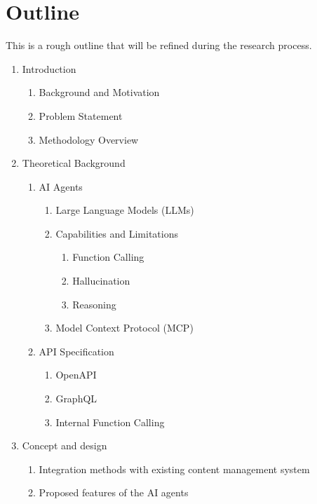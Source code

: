 \documentclass[12pt,a4paper]{article}
\begin{document}
\section*{Outline}
This is a rough outline that will be refined during the research process.
\begin{enumerate}
	\item Introduction
	      \begin{enumerate}
		      \item Background and Motivation
		      \item Problem Statement
		      \item Methodology Overview
	      \end{enumerate}
	\item Theoretical Background
	      \begin{enumerate}
		      \item AI Agents
		            \begin{enumerate}
			            \item Large Language Models (LLMs)
			            \item Capabilities and Limitations
			                  \begin{enumerate}
				                  \item Function Calling
				                  \item Hallucination
				                  \item Reasoning
			                  \end{enumerate}
			            \item Model Context Protocol (MCP)
		            \end{enumerate}
		      \item API Specification
		            \begin{enumerate}
			            \item OpenAPI
			            \item GraphQL
			            \item Internal Function Calling
		            \end{enumerate}
	      \end{enumerate}
	\item Concept and design
	      \begin{enumerate}
		      \item Integration methods with existing content management system
		      \item Proposed features of the AI agents
	      \end{enumerate}

\end{enumerate}
\end{document}
